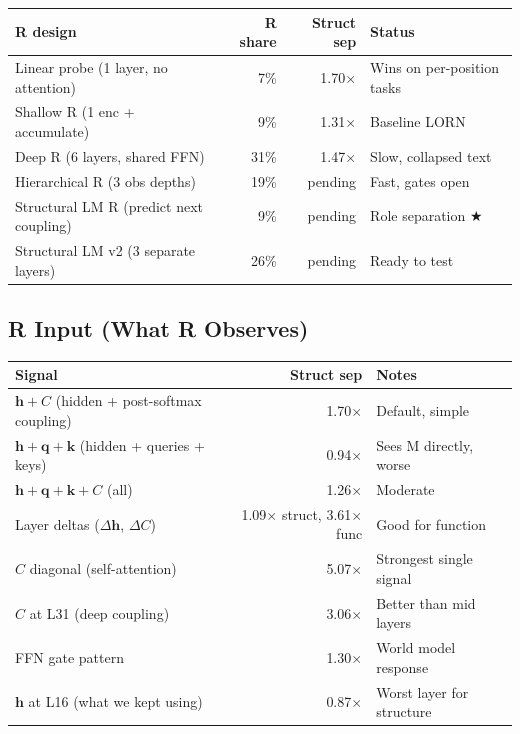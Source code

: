 \documentclass[11pt, a4paper]{article}
\newcommand{\h}{\mathbf{h}}
\theoremstyle{plain}
\theoremstyle{definition}
\theoremstyle{remark}
\begin{document}
\begin{center}\small
\begin{tabular}{lrrl}
\toprule
\textbf{R design} & \textbf{R share} & \textbf{Struct sep} & \textbf{Status} \\
\midrule
Linear probe (1 layer, no attention) & 7\% & 1.70$\times$ & Wins on per-position tasks \\
Shallow R (1 enc + accumulate) & 9\% & 1.31$\times$ & Baseline LORN \\
Deep R (6 layers, shared FFN) & 31\% & 1.47$\times$ & Slow, collapsed text \\
Hierarchical R (3 obs depths) & 19\% & pending & Fast, gates open \\
Structural LM R (predict next coupling) & 9\% & pending & Role separation ★ \\
Structural LM v2 (3 separate layers) & 26\% & pending & Ready to test \\
\bottomrule
\end{tabular}
\end{center}

\subsection{R Input (What R Observes)}

\begin{center}\small
\begin{tabular}{lrl}
\toprule
\textbf{Signal} & \textbf{Struct sep} & \textbf{Notes} \\
\midrule
$\h + C$ (hidden + post-softmax coupling) & 1.70$\times$ & Default, simple \\
$\h + \mathbf{q} + \mathbf{k}$ (hidden + queries + keys) & 0.94$\times$ & Sees M directly, worse \\
$\h + \mathbf{q} + \mathbf{k} + C$ (all) & 1.26$\times$ & Moderate \\
Layer deltas ($\Delta\h$, $\Delta C$) & 1.09$\times$ struct, 3.61$\times$ func & Good for function \\
$C$ diagonal (self-attention) & 5.07$\times$ & Strongest single signal \\
$C$ at L31 (deep coupling) & 3.06$\times$ & Better than mid layers \\
FFN gate pattern & 1.30$\times$ & World model response \\
$\h$ at L16 (what we kept using) & 0.87$\times$ & Worst layer for structure \\
\bottomrule
\end{tabular}
\end{center}
\end{document}
